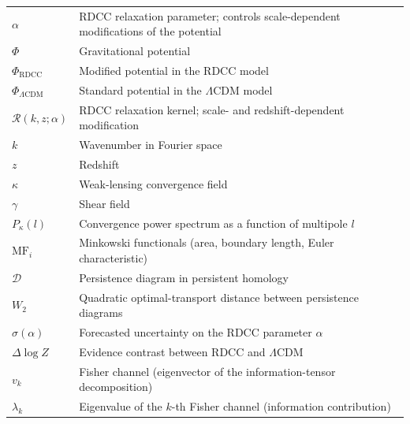 \documentclass[11pt,a4paper]{article}
\begin{document}
\begin{tabular}{ll}
$\alpha$ & RDCC relaxation parameter; controls scale-dependent modifications of the potential \\[4pt]

$\Phi$ & Gravitational potential \\[4pt]

$\Phi_{\mathrm{RDCC}}$ & Modified potential in the RDCC model \\[4pt]

$\Phi_{\Lambda\mathrm{CDM}}$ & Standard potential in the $\Lambda$CDM model \\[4pt]

$\mathcal{R}(k,z;\alpha)$ & RDCC relaxation kernel; scale- and redshift-dependent modification \\[4pt]

$k$ & Wavenumber in Fourier space \\[4pt]

$z$ & Redshift \\[4pt]

$\kappa$ & Weak-lensing convergence field \\[4pt]

$\gamma$ & Shear field \\[4pt]

$P_{\kappa}(l)$ & Convergence power spectrum as a function of multipole $l$ \\[4pt]

$\mathrm{MF}_{i}$ & Minkowski functionals (area, boundary length, Euler characteristic) \\[4pt]

$\mathcal{D}$ & Persistence diagram in persistent homology \\[4pt]

$W_{2}$ & Quadratic optimal-transport distance between persistence diagrams \\[4pt]

$\sigma(\alpha)$ & Forecasted uncertainty on the RDCC parameter $\alpha$ \\[4pt]

$\Delta \log Z$ & Evidence contrast between RDCC and $\Lambda$CDM \\[4pt]

$v_{k}$ & Fisher channel (eigenvector of the information-tensor decomposition) \\[4pt]

$\lambda_{k}$ & Eigenvalue of the $k$-th Fisher channel (information contribution) \\[4pt]
\end{tabular}
\end{document}

